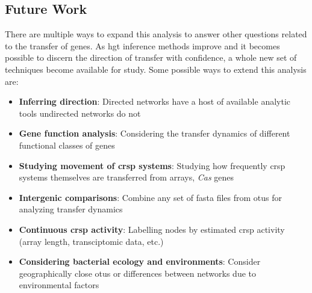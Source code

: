 \subsection{Future Work}
There are multiple ways to expand this analysis to answer other questions related to the transfer of genes.
As \ac{hgt} inference methods improve and it becomes possible to discern the direction of transfer with confidence, a whole new set of techniques become available for study.
Some possible ways to extend this analysis are:
\begin{itemize}
    \item \textbf{Inferring direction}: Directed networks have a host of available analytic tools undirected networks do not
    \item \textbf{Gene function analysis}: Considering the transfer dynamics of different functional classes of genes
    \item \textbf{Studying movement of \ac{crsp} systems}: Studying how frequently \ac{crsp} systems themselves are transferred from arrays, \textit{Cas} genes
    \item \textbf{Intergenic comparisons}: Combine any set of fasta files from \ac{otu}s for analyzing transfer dynamics
    \item \textbf{Continuous \ac{crsp} activity}: Labelling nodes by estimated \ac{crsp} activity (array length, transciptomic data, etc.)
    \item \textbf{Considering bacterial ecology and environments}: Consider geographically close \ac{otu}s or differences between networks due to environmental factors
\end{itemize}
